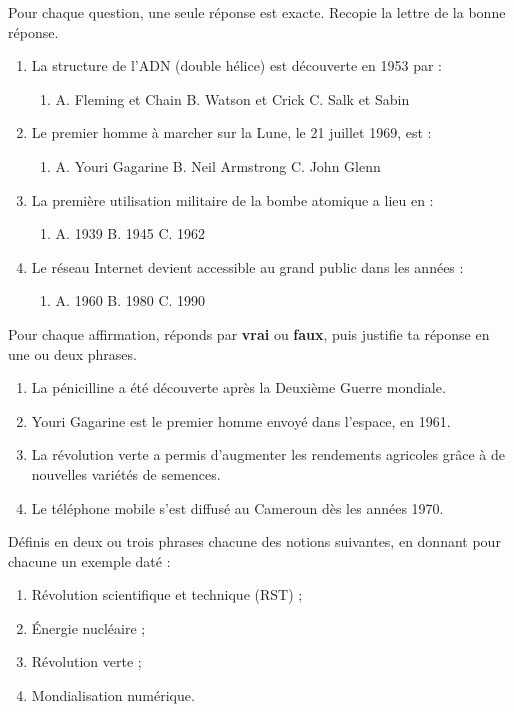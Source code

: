 \documentclass[11pt]{article}
\newcommand{\cle}[1]{{\popxbold\color{popdark}#1}}
\begin{document}
\begin{exercice}
Pour chaque question, une seule réponse est exacte. Recopie la lettre de la bonne réponse.
\begin{enumerate}
\item La structure de l'ADN (double hélice) est découverte en 1953 par :
\begin{enumerate}
\item A. Fleming et Chain \quad B. Watson et Crick \quad C. Salk et Sabin
\end{enumerate}
\item Le premier homme à marcher sur la Lune, le 21 juillet 1969, est :
\begin{enumerate}
\item A. Youri Gagarine \quad B. Neil Armstrong \quad C. John Glenn
\end{enumerate}
\item La première utilisation militaire de la bombe atomique a lieu en :
\begin{enumerate}
\item A. 1939 \quad B. 1945 \quad C. 1962
\end{enumerate}
\item Le réseau Internet devient accessible au grand public dans les années :
\begin{enumerate}
\item A. 1960 \quad B. 1980 \quad C. 1990
\end{enumerate}
\end{enumerate}
\end{exercice}

\begin{exercice}
Pour chaque affirmation, réponds par \textbf{vrai} ou \textbf{faux}, puis justifie ta réponse en une ou deux phrases.
\begin{enumerate}
\item La pénicilline a été découverte après la Deuxième Guerre mondiale.
\item Youri Gagarine est le premier homme envoyé dans l'espace, en 1961.
\item La révolution verte a permis d'augmenter les rendements agricoles grâce à de nouvelles variétés de semences.
\item Le téléphone mobile s'est diffusé au Cameroun dès les années 1970.
\end{enumerate}
\end{exercice}

\begin{exercice}[Définitions]
Définis en deux ou trois phrases chacune des notions suivantes, en donnant pour chacune un exemple daté :
\begin{enumerate}
\item \cle{Révolution scientifique et technique} (RST) ;
\item \cle{Énergie nucléaire} ;
\item \cle{Révolution verte} ;
\item \cle{Mondialisation numérique}.
\end{enumerate}
\end{exercice}
\end{document}
